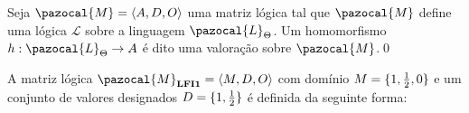         \begin{definicao}[Valoração]
            Seja $\pazocal{M} = \langle A, D, O \rangle$ uma matriz lógica tal que $\pazocal{M}$ define uma lógica $\mathcal{L}$ sobre a linguagem $\pazocal{L}_{\Theta}$. Um homomorfismo $h : \pazocal{L}_{\Theta} \to A$ é dito uma valoração sobre $\pazocal{M}$.\qed{}
        \end{definicao}



        \begin{definicao}
            A matriz lógica $\pazocal{M}_{\lfium{}} = \langle M, D, O \rangle$ com domínio $M = \{1, \frac{1}{2}{}, 0\}$ e um conjunto de valores designados $D = \{1, \frac{1}{2}{}\}$ é definida da seguinte forma:


\end{definicao}
